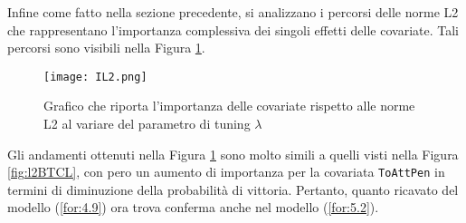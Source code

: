 Infine come fatto nella sezione precedente, si analizzano i percorsi delle norme L2 che rappresentano l'importanza complessiva dei singoli effetti delle covariate. Tali percorsi sono visibili nella Figura \ref{fig:IL2}.

\begin{figure}[htbp]
	\begin{center}
		\texttt{[image: IL2.png]}
		\caption{Grafico che riporta l'importanza delle covariate rispetto alle norme L2 al variare del parametro di tuning $\lambda$} \label{fig:IL2}
	\end{center}
\end{figure}

Gli andamenti ottenuti nella Figura \ref{fig:IL2} sono molto simili a quelli visti nella Figura \ref{fig:l2BTCL}, con pero un aumento di importanza per la covariata \texttt{ToAttPen} in termini di diminuzione della probabilità di vittoria. Pertanto, quanto ricavato del modello (\ref{for:4.9}) ora trova conferma anche nel modello (\ref{for:5.2}).\\

